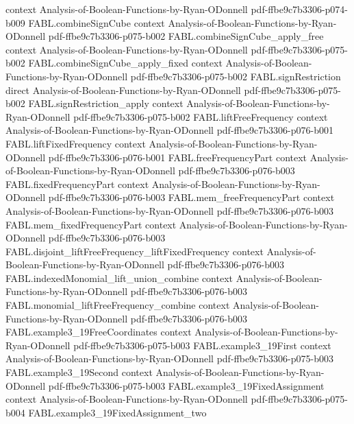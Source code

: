 \begin{theorem}
  {context}
  {Analysis-of-Boolean-Functions-by-Ryan-ODonnell}
  {pdf-ffbe9c7b3306-p074-b009}
\proofstep
  {FABL.combineSignCube}
  {context}
  {Analysis-of-Boolean-Functions-by-Ryan-ODonnell}
  {pdf-ffbe9c7b3306-p075-b002}
\proofstep
  {FABL.combineSignCube_apply_free}
  {context}
  {Analysis-of-Boolean-Functions-by-Ryan-ODonnell}
  {pdf-ffbe9c7b3306-p075-b002}
\proofstep
  {FABL.combineSignCube_apply_fixed}
  {context}
  {Analysis-of-Boolean-Functions-by-Ryan-ODonnell}
  {pdf-ffbe9c7b3306-p075-b002}
\proofstep
  {FABL.signRestriction}
  {direct}
  {Analysis-of-Boolean-Functions-by-Ryan-ODonnell}
  {pdf-ffbe9c7b3306-p075-b002}
\proofstep
  {FABL.signRestriction_apply}
  {context}
  {Analysis-of-Boolean-Functions-by-Ryan-ODonnell}
  {pdf-ffbe9c7b3306-p075-b002}
\proofstep
  {FABL.liftFreeFrequency}
  {context}
  {Analysis-of-Boolean-Functions-by-Ryan-ODonnell}
  {pdf-ffbe9c7b3306-p076-b001}
\proofstep
  {FABL.liftFixedFrequency}
  {context}
  {Analysis-of-Boolean-Functions-by-Ryan-ODonnell}
  {pdf-ffbe9c7b3306-p076-b001}
\proofstep
  {FABL.freeFrequencyPart}
  {context}
  {Analysis-of-Boolean-Functions-by-Ryan-ODonnell}
  {pdf-ffbe9c7b3306-p076-b003}
\proofstep
  {FABL.fixedFrequencyPart}
  {context}
  {Analysis-of-Boolean-Functions-by-Ryan-ODonnell}
  {pdf-ffbe9c7b3306-p076-b003}
\proofstep
  {FABL.mem_freeFrequencyPart}
  {context}
  {Analysis-of-Boolean-Functions-by-Ryan-ODonnell}
  {pdf-ffbe9c7b3306-p076-b003}
\proofstep
  {FABL.mem_fixedFrequencyPart}
  {context}
  {Analysis-of-Boolean-Functions-by-Ryan-ODonnell}
  {pdf-ffbe9c7b3306-p076-b003}
\proofstep
  {FABL.disjoint_liftFreeFrequency_liftFixedFrequency}
  {context}
  {Analysis-of-Boolean-Functions-by-Ryan-ODonnell}
  {pdf-ffbe9c7b3306-p076-b003}
\proofstep
  {FABL.indexedMonomial_lift_union_combine}
  {context}
  {Analysis-of-Boolean-Functions-by-Ryan-ODonnell}
  {pdf-ffbe9c7b3306-p076-b003}
\proofstep
  {FABL.monomial_liftFreeFrequency_combine}
  {context}
  {Analysis-of-Boolean-Functions-by-Ryan-ODonnell}
  {pdf-ffbe9c7b3306-p076-b003}
\proofstep
  {FABL.example3_19FreeCoordinates}
  {context}
  {Analysis-of-Boolean-Functions-by-Ryan-ODonnell}
  {pdf-ffbe9c7b3306-p075-b003}
\proofstep
  {FABL.example3_19First}
  {context}
  {Analysis-of-Boolean-Functions-by-Ryan-ODonnell}
  {pdf-ffbe9c7b3306-p075-b003}
\proofstep
  {FABL.example3_19Second}
  {context}
  {Analysis-of-Boolean-Functions-by-Ryan-ODonnell}
  {pdf-ffbe9c7b3306-p075-b003}
\proofstep
  {FABL.example3_19FixedAssignment}
  {context}
  {Analysis-of-Boolean-Functions-by-Ryan-ODonnell}
  {pdf-ffbe9c7b3306-p075-b004}
\proofstep
  {FABL.example3_19FixedAssignment_two}

\end{theorem}

